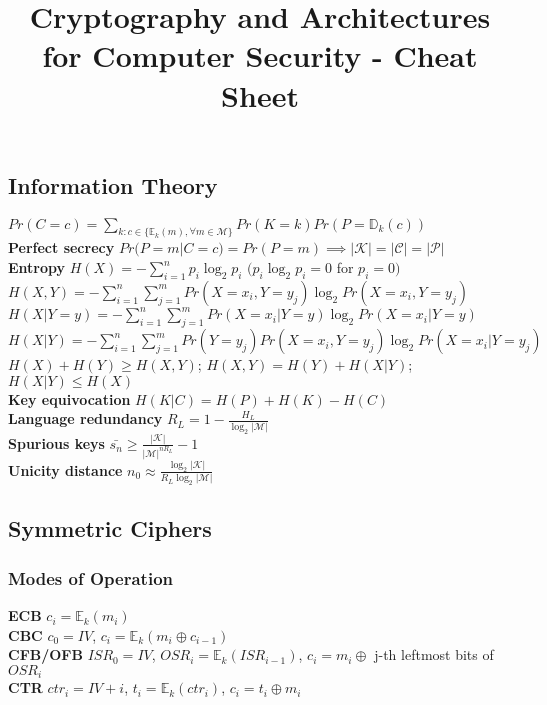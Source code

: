 \documentclass[twoside, 11pt]{article}
\title{Cryptography and Architectures for Computer Security - Cheat Sheet}
\author{}
\date{}
\begin{document}
    \maketitle
        
        \subsection*{Information Theory}
            $Pr(C=c) = \sum_{k : c \in \lbrace \mathds{E}_{k}(m), \forall m \in \mathcal{M} \rbrace} Pr(K = k)Pr(P = \mathds{D}_k(c))$ \\
            \textbf{Perfect secrecy} $Pr(P=m|C=c) = Pr(P=m) \implies |\mathcal{K}| = |\mathcal{C}| = |\mathcal{P}|$ \\
            \textbf{Entropy} $H(X) = -\sum_{i=1}^{n} p_{i}\log_{2}p_{i}$ \quad $(p_{i}\log_{2}p_{i} = 0$ for $p_{i} = 0)$ \\
            $H(X, Y) = - \sum_{i=1}^{n} \sum_{j=1}^{m}Pr(X = x_{i}, Y = y_{j})\log_{2}Pr(X = x_{i}, Y = y_{j})$ \\
            $H(X | Y = y) = - \sum_{i=1}^{n} \sum_{j=1}^{m}Pr(X=x_{i} |Y = y)\log_{2}Pr(X = x_{i} | Y = y)$ \\
            $H(X | Y) = - \sum_{i=1}^{n} \sum_{j=1}^{m}Pr(Y = y_{j})Pr(X = x_{i}, Y=y_{j})\log_{2}Pr(X = x_{i} | Y = y_{j})$ \\
            $H(X) + H(Y) \geqslant H(X, Y)$; $H(X, Y)  = H(Y) + H(X|Y)$; $H(X|Y) \leqslant H(X)$ \\
            \textbf{Key equivocation} $H(K|C) = H(P)+H(K)-H(C)$ \\
            \textbf{Language redundancy} $R_{L} = 1 - \frac{H_{L}}{\log_{2}|\mathcal{M}|}$ \\
            \textbf{Spurious keys} $\bar{s_{n}} \geqslant \frac{|\mathcal{K}|}{|\mathcal{M}|^{nR_{L}}}-1$ \\
            \textbf{Unicity distance} $n_{0} \approx \frac{\log_{2}|\mathcal{K}|}{R_{L}\log_{2}|\mathcal{M}|}$
        
        \subsection*{Symmetric Ciphers}
            \subsubsection*{Modes of Operation}
                \textbf{ECB} $c_{i} = \mathds{E}_{k}(m_{i})$ \\
                \textbf{CBC} $c_{0}=IV$, $c_{i}=\mathds{E}_{k}(m_{i} \oplus c_{i-1})$ \\
                \textbf{CFB/OFB} $ISR_{0}=IV$, $OSR_{i} = \mathds{E}_{k}(ISR_{i-1})$, $c_{i} = m_{i} \oplus$ j-th leftmost bits of $OSR_{i}$ \\ 
                \textbf{CTR} $ctr_{i}=IV+i$, $t_{i} = \mathds{E}_{k}(ctr_{i})$, $c_{i} = t_{i} \oplus m_{i}$
            
\end{document}
